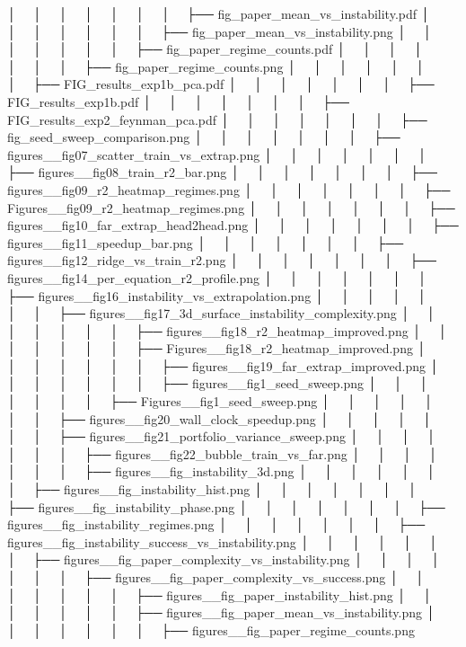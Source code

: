 │   │       │   │   │   │   │   ├── fig_paper_mean_vs_instability.pdf
│   │       │   │   │   │   │   ├── fig_paper_mean_vs_instability.png
│   │       │   │   │   │   │   ├── fig_paper_regime_counts.pdf
│   │       │   │   │   │   │   ├── fig_paper_regime_counts.png
│   │       │   │   │   │   │   ├── FIG_results_exp1b_pca.pdf
│   │       │   │   │   │   │   ├── FIG_results_exp1b.pdf
│   │       │   │   │   │   │   ├── FIG_results_exp2_feynman_pca.pdf
│   │       │   │   │   │   │   ├── fig_seed_sweep_comparison.png
│   │       │   │   │   │   │   ├── figures__fig07_scatter_train_vs_extrap.png
│   │       │   │   │   │   │   ├── figures__fig08_train_r2_bar.png
│   │       │   │   │   │   │   ├── figures__fig09_r2_heatmap_regimes.png
│   │       │   │   │   │   │   ├── Figures__fig09_r2_heatmap_regimes.png
│   │       │   │   │   │   │   ├── figures__fig10_far_extrap_head2head.png
│   │       │   │   │   │   │   ├── figures__fig11_speedup_bar.png
│   │       │   │   │   │   │   ├── figures__fig12_ridge_vs_train_r2.png
│   │       │   │   │   │   │   ├── figures__fig14_per_equation_r2_profile.png
│   │       │   │   │   │   │   ├── figures__fig16_instability_vs_extrapolation.png
│   │       │   │   │   │   │   ├── figures__fig17_3d_surface_instability_complexity.png
│   │       │   │   │   │   │   ├── figures__fig18_r2_heatmap_improved.png
│   │       │   │   │   │   │   ├── Figures__fig18_r2_heatmap_improved.png
│   │       │   │   │   │   │   ├── figures__fig19_far_extrap_improved.png
│   │       │   │   │   │   │   ├── figures__fig1_seed_sweep.png
│   │       │   │   │   │   │   ├── Figures__fig1_seed_sweep.png
│   │       │   │   │   │   │   ├── figures__fig20_wall_clock_speedup.png
│   │       │   │   │   │   │   ├── figures__fig21_portfolio_variance_sweep.png
│   │       │   │   │   │   │   ├── figures__fig22_bubble_train_vs_far.png
│   │       │   │   │   │   │   ├── figures__fig_instability_3d.png
│   │       │   │   │   │   │   ├── figures__fig_instability_hist.png
│   │       │   │   │   │   │   ├── figures__fig_instability_phase.png
│   │       │   │   │   │   │   ├── figures__fig_instability_regimes.png
│   │       │   │   │   │   │   ├── figures__fig_instability_success_vs_instability.png
│   │       │   │   │   │   │   ├── figures__fig_paper_complexity_vs_instability.png
│   │       │   │   │   │   │   ├── figures__fig_paper_complexity_vs_success.png
│   │       │   │   │   │   │   ├── figures__fig_paper_instability_hist.png
│   │       │   │   │   │   │   ├── figures__fig_paper_mean_vs_instability.png
│   │       │   │   │   │   │   ├── figures__fig_paper_regime_counts.png
